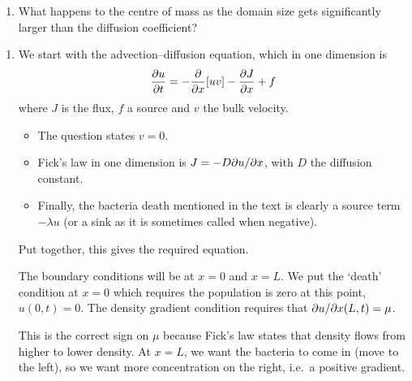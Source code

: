 \documentclass[a4paper,12pt]{article}
\begin{document}
\begin{enumerate}
{\begin{enumerate}
        \item{What happens to the centre of mass as the domain size gets significantly larger than the diffusion coefficient?
          }
      \end{enumerate}
    }
    { %
      \begin{enumerate}
        \item %
          We start with the advection--diffusion equation, which in one dimension is
          \begin{equation}
            \pd{u}{t} = -\pd{}{x}[uv] - \pd{J}{x} + f
          \end{equation}
          where $J$ is the flux, $f$ a source and $v$ the bulk velocity.
          \begin{itemize}
            \item The question states $v=0$.
            \item Fick's law in one dimension is $J = -D\pd{u}{x}$, with $D$ the diffusion constant.
            \item Finally, the bacteria death mentioned in the text is clearly a source term $-\lambda u$ (or a sink as it is sometimes called when negative).
          \end{itemize}
          Put together, this gives the required equation.

          The boundary conditions will be at $x=0$ and $x=L$. We put the `death' condition at $x=0$ which requires the population is zero at this point, $u(0,t)=0$. The density gradient condition requires that $\pd{u}{x}(L,t)=\mu$.

          This is the correct sign on $\mu$ because Fick's law states that density flows from higher to lower density. At $x=L$, we want the bacteria to come in (move to the left), so we want more concentration on the right, i.e.\ a positive gradient.
\end{enumerate}}
\end{enumerate}
\end{document}
